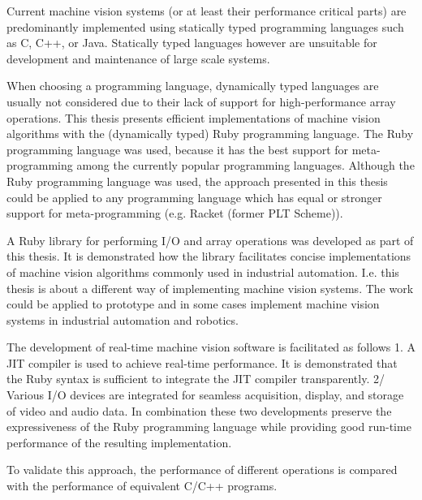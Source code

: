 Current machine vision systems (or at least their performance critical parts) are predominantly implemented using statically typed programming languages such as C, C++, or Java. Statically typed languages however are unsuitable for development and maintenance of large scale systems.

When choosing a programming language, dynamically typed languages are usually not considered due to their lack of support for high-performance array operations. This thesis presents efficient implementations of machine vision algorithms with the (dynamically typed) Ruby programming language. The Ruby programming language was used, because it has the best support for meta-programming among the currently popular pro\-gram\-ming languages. Although the Ruby programming language was used, the approach presented in this thesis could be applied to any programming language which has equal or stronger support for meta-programming (e.g. Racket (former PLT Scheme)).

A Ruby library for performing I/O and array operations was developed as part of this thesis. It is demonstrated how the library facilitates concise implementations of machine vision algorithms commonly used in industrial automation. I.e. this thesis is about a different way of implementing machine vision systems. The work could be applied to prototype and in some cases implement machine vision systems in industrial automation and robotics.

The development of real-time machine vision software is facilitated as follows
1. A JIT compiler is used to achieve real-time performance. It is demonstrated that the Ruby syntax is sufficient to integrate the JIT compiler transparently.
2/ Various I/O devices are integrated for seamless acquisition, display, and storage of video and audio data.
In combination these two developments preserve the expressiveness of the Ruby programming language while providing good run-time performance of the resulting implementation.

To validate this approach, the performance of different operations is compared with the performance of equivalent C/C++ programs.
